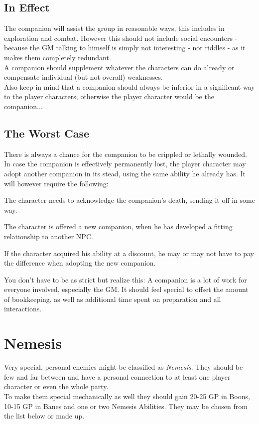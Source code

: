 \documentclass[12pt,a4paper,openany,usenames,dvipsnames]{book}
\begin{document}
	\section{In Effect}
	The companion will assist the group in reasonable ways, this includes in exploration and combat. However this should not include social encounters - because the GM talking to himself is simply not interesting - nor riddles - as it makes them completely redundant.\\
	A companion should supplement whatever the characters can do already or compensate individual (but not overall) weaknesses.\\
	Also keep in mind that a companion should always be inferior in a significant way to the player characters, otherwise the player character would be the companion...
	\section{The Worst Case}
	There is always a chance for the companion to be crippled or lethally wounded. In case the companion is effectively permanently lost, the player character may adopt another companion in its stead, using the same ability he already has. It will however require the following:
	\begin{sitemize}[8]
		\item The character needs to acknowledge the companion's death, sending it off in some way.
		\item The character is offered a new companion, when he has developed a fitting relationship to another NPC.
		\item If the character acquired his ability at a discount, he may or may not have to pay the difference when adopting the new companion.
	\end{sitemize}
	\begin{exampleblock}
		You don't have to be as strict but realize this:
		A companion is a lot of work for everyone involved, especially the GM.
		It should feel special to offset the amount of bookkeeping,
			as well as additional time spent on preparation and all interactions.
	\end{exampleblock}
	

	\chapter{Nemesis}
	Very special, personal enemies might be classified as \emph{Nemesis}.
	They should be few and far between and have a personal connection to at least one player character or even the whole party.\\
	To make them special mechanically as well they should gain 20-25 GP in Boons,
		10-15 GP in Banes
		and one or two Nemesis Abilities.
	They may be chosen from the list below or made up.
\end{document}
